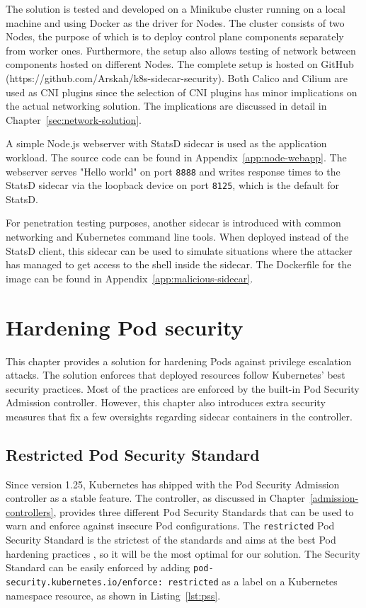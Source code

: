 \documentclass[english, 12pt, a4paper, sci, utf8, a-2b, online]{aaltothesis}
\begin{document}
The solution is tested and developed on a Minikube cluster running on a local machine and using Docker as the driver for Nodes.
The cluster consists of two Nodes, the purpose of which is to deploy control plane components separately from worker ones.
Furthermore, the setup also allows testing of network between components hosted on different Nodes.
The complete setup is hosted on GitHub (https://github.com/Arskah/k8s-sidecar-security).
Both Calico and Cilium are used as CNI plugins since the selection of CNI plugins has minor implications on the actual networking solution. %
The implications are discussed in detail in Chapter~\ref{sec:network-solution}.

A simple Node.js webserver with StatsD sidecar is used as the application workload.
The source code can be found in Appendix~\ref{app:node-webapp}.
The webserver serves "Hello world" on port \lstinline{8888} and writes response times to the StatsD sidecar via the loopback device on port \lstinline{8125}, which is the default for StatsD.

For penetration testing purposes, another sidecar is introduced with common networking and Kubernetes command line tools.
When deployed instead of the StatsD client, this sidecar can be used to simulate situations where the attacker has managed to get access to the shell inside the sidecar.
The Dockerfile for the image can be found in Appendix~\ref{app:malicious-sidecar}.

\clearpage

\section{Hardening Pod security} \label{sec:pod-hardening}

This chapter provides a solution for hardening Pods against privilege escalation attacks.
The solution enforces that deployed resources follow Kubernetes' best security practices.
Most of the practices are enforced by the built-in Pod Security Admission controller.
However, this chapter also introduces extra security measures that fix a few oversights regarding sidecar containers in the controller.

\subsection{Restricted Pod Security Standard}

Since version 1.25, Kubernetes has shipped with the Pod Security Admission controller as a stable feature.
The controller, as discussed in Chapter~\ref{admission-controllers}, provides three different Pod Security Standards that can be used to warn and enforce against insecure Pod configurations.
The \lstinline{restricted} Pod Security Standard is the strictest of the standards and aims at the best Pod hardening practices \cite{k8s-docs-pss}, so it will be the most optimal for our solution.
The Security Standard can be easily enforced by adding \lstinline{pod-security.kubernetes.io/enforce: restricted} as a label on a Kubernetes namespace resource, as shown in Listing~\ref{lst:pss}.
\end{document}

